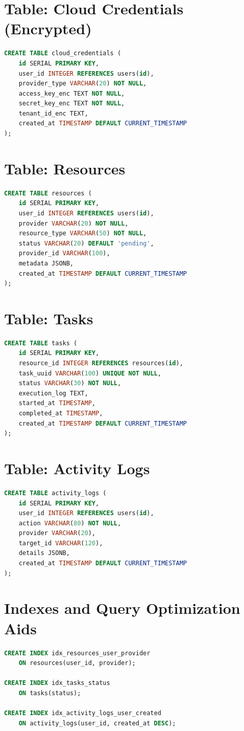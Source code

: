 \section{Table: Cloud Credentials (Encrypted)}
\begin{lstlisting}[language=SQL]
CREATE TABLE cloud_credentials (
    id SERIAL PRIMARY KEY,
    user_id INTEGER REFERENCES users(id),
    provider_type VARCHAR(20) NOT NULL,
    access_key_enc TEXT NOT NULL,
    secret_key_enc TEXT NOT NULL,
    tenant_id_enc TEXT,
    created_at TIMESTAMP DEFAULT CURRENT_TIMESTAMP
);
\end{lstlisting}

\section{Table: Resources}
\begin{lstlisting}[language=SQL]
CREATE TABLE resources (
    id SERIAL PRIMARY KEY,
    user_id INTEGER REFERENCES users(id),
    provider VARCHAR(20) NOT NULL,
    resource_type VARCHAR(50) NOT NULL,
    status VARCHAR(20) DEFAULT 'pending',
    provider_id VARCHAR(100),
    metadata JSONB,
    created_at TIMESTAMP DEFAULT CURRENT_TIMESTAMP
);
\end{lstlisting}

\section{Table: Tasks}
\begin{lstlisting}[language=SQL]
CREATE TABLE tasks (
    id SERIAL PRIMARY KEY,
    resource_id INTEGER REFERENCES resources(id),
    task_uuid VARCHAR(100) UNIQUE NOT NULL,
    status VARCHAR(30) NOT NULL,
    execution_log TEXT,
    started_at TIMESTAMP,
    completed_at TIMESTAMP,
    created_at TIMESTAMP DEFAULT CURRENT_TIMESTAMP
);
\end{lstlisting}

\section{Table: Activity Logs}
\begin{lstlisting}[language=SQL]
CREATE TABLE activity_logs (
    id SERIAL PRIMARY KEY,
    user_id INTEGER REFERENCES users(id),
    action VARCHAR(80) NOT NULL,
    provider VARCHAR(20),
    target_id VARCHAR(120),
    details JSONB,
    created_at TIMESTAMP DEFAULT CURRENT_TIMESTAMP
);
\end{lstlisting}

\section{Indexes and Query Optimization Aids}
\begin{lstlisting}[language=SQL]
CREATE INDEX idx_resources_user_provider
    ON resources(user_id, provider);

CREATE INDEX idx_tasks_status
    ON tasks(status);

CREATE INDEX idx_activity_logs_user_created
    ON activity_logs(user_id, created_at DESC);
\end{lstlisting}

\newpage

